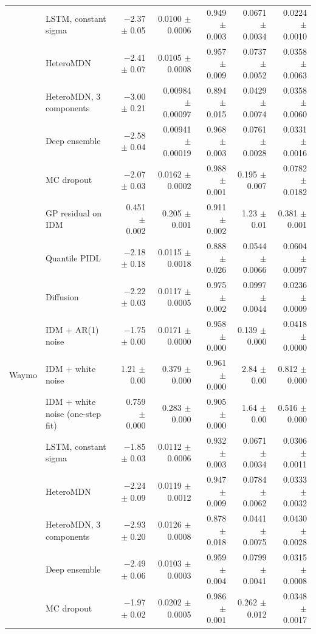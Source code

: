 \begin{longtable}{llrrrrr}
 & LSTM, constant sigma & $-$2.37 $\pm$ 0.05 & 0.0100 $\pm$ 0.0006 & 0.949 $\pm$ 0.003 & 0.0671 $\pm$ 0.0034 & 0.0224 $\pm$ 0.0010 \\
 & HeteroMDN & $-$2.41 $\pm$ 0.07 & 0.0105 $\pm$ 0.0008 & 0.957 $\pm$ 0.009 & 0.0737 $\pm$ 0.0052 & 0.0358 $\pm$ 0.0063 \\
 & HeteroMDN, 3 components & $-$3.00 $\pm$ 0.21 & 0.00984 $\pm$ 0.00097 & 0.894 $\pm$ 0.015 & 0.0429 $\pm$ 0.0074 & 0.0358 $\pm$ 0.0060 \\
 & Deep ensemble & $-$2.58 $\pm$ 0.04 & 0.00941 $\pm$ 0.00019 & 0.968 $\pm$ 0.003 & 0.0761 $\pm$ 0.0028 & 0.0331 $\pm$ 0.0016 \\
 & MC dropout & $-$2.07 $\pm$ 0.03 & 0.0162 $\pm$ 0.0002 & 0.988 $\pm$ 0.001 & 0.195 $\pm$ 0.007 & 0.0782 $\pm$ 0.0182 \\
 & GP residual on IDM & 0.451 $\pm$ 0.002 & 0.205 $\pm$ 0.001 & 0.911 $\pm$ 0.002 & 1.23 $\pm$ 0.01 & 0.381 $\pm$ 0.001 \\
 & Quantile PIDL & $-$2.18 $\pm$ 0.18 & 0.0115 $\pm$ 0.0018 & 0.888 $\pm$ 0.026 & 0.0544 $\pm$ 0.0066 & 0.0604 $\pm$ 0.0097 \\
 & Diffusion & $-$2.22 $\pm$ 0.03 & 0.0117 $\pm$ 0.0005 & 0.975 $\pm$ 0.002 & 0.0997 $\pm$ 0.0044 & 0.0236 $\pm$ 0.0009 \\
 & IDM + AR(1) noise & $-$1.75 $\pm$ 0.00 & 0.0171 $\pm$ 0.0000 & 0.958 $\pm$ 0.000 & 0.139 $\pm$ 0.000 & 0.0418 $\pm$ 0.0000 \\
\midrule
Waymo & IDM + white noise & 1.21 $\pm$ 0.00 & 0.379 $\pm$ 0.000 & 0.961 $\pm$ 0.000 & 2.84 $\pm$ 0.00 & 0.812 $\pm$ 0.000 \\
 & IDM + white noise (one-step fit) & 0.759 $\pm$ 0.000 & 0.283 $\pm$ 0.000 & 0.905 $\pm$ 0.000 & 1.64 $\pm$ 0.00 & 0.516 $\pm$ 0.000 \\
 & LSTM, constant sigma & $-$1.85 $\pm$ 0.03 & 0.0112 $\pm$ 0.0006 & 0.932 $\pm$ 0.003 & 0.0671 $\pm$ 0.0034 & 0.0306 $\pm$ 0.0011 \\
 & HeteroMDN & $-$2.24 $\pm$ 0.09 & 0.0119 $\pm$ 0.0012 & 0.947 $\pm$ 0.009 & 0.0784 $\pm$ 0.0062 & 0.0333 $\pm$ 0.0032 \\
 & HeteroMDN, 3 components & $-$2.93 $\pm$ 0.20 & 0.0126 $\pm$ 0.0008 & 0.878 $\pm$ 0.018 & 0.0441 $\pm$ 0.0075 & 0.0430 $\pm$ 0.0028 \\
 & Deep ensemble & $-$2.49 $\pm$ 0.06 & 0.0103 $\pm$ 0.0003 & 0.959 $\pm$ 0.004 & 0.0799 $\pm$ 0.0041 & 0.0315 $\pm$ 0.0008 \\
 & MC dropout & $-$1.97 $\pm$ 0.02 & 0.0202 $\pm$ 0.0005 & 0.986 $\pm$ 0.001 & 0.262 $\pm$ 0.012 & 0.0348 $\pm$ 0.0017 \\

\end{longtable}
